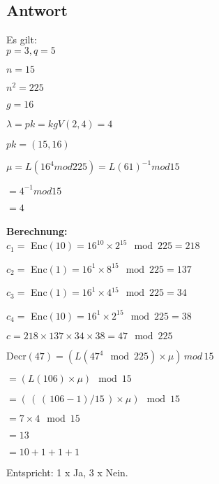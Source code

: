 \documentclass[a4paper]{article}
\begin{document}
\subsection*{Antwort}

Es gilt: \\

$	p = 3 , q = 5 $

$	n = 15$

$	n^2 = 225$

$	g = 16$

$	\lambda = pk =  kgV(2,4) = 4 $

$	pk = (15, 16)$

$	\mu = L(16^4 mod 225) = L(61)^{-1} mod 15$

$	= 4^{-1} mod 15$

$	= 4 $
\\
\\
\textbf{Berechnung:} \\

$c_1 = $ Enc$(10) = 16^{10} \times  2^{15} \mod 225 = 218$

$c_2 = $ Enc$(1) = 16^1 \times 8^{15} \mod 225 = 137$

$c_3 = $ Enc$(1) = 16^1 \times 4{^15} \mod 225 = 34$

$c_4 = $ Enc$(10) = 16^1 \times 2^{15} \mod 225 = 38$

$c = 218 \times 137 \times 34 \times 38 = 47 \mod 225$

Decr$(47) = ( L(47^4 \mod 225) \times \mu )\,  mod \, 15$

$= ( L(106) \times \mu ) \mod 15$ 

$=  (\, (\,(\,106 - 1)  /  15\,) \times \mu )\mod 15$

$= 7 \times 4 \mod 15 $

$= 13$

$= 10 + 1 + 1 + 1 $

Entspricht: 1 x Ja, 3 x Nein.  
	
\end{document}
